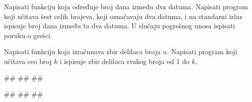 \begin{Exercise}[label=p1.4_] 
Napisati funkciju  koja određuje broj
dana između dva datuma. Napisati program koji učitava šest celih
brojeva, koji označavaju dva datuma, i na standarni izlaz ispisuje
broj dana između ta dva datuma. U slučaju pogrešnog unosa ispisati
poruku o grešci.

\end{Exercise}
\begin{Answer}[ref=p1.4_]
\end{Answer}


\begin{Exercise}[label=p1.4_08] 
 Napisati funkciju  koja izračunava
 zbir delilaca broja $n$. Napisati program koji učitava ceo broj $k$ i
 ispisuje zbir delilaca svakog broja od 1 do $k$.
 
\begin{miditest}
\begin{upotreba}{1}
#\naslovInt#
##
##
\end{upotreba}
\end{miditest}
\begin{miditest}
\begin{upotreba}{2}
#\naslovInt#
##
##
\end{upotreba}
\end{miditest}

\end{Exercise}
\begin{Answer}[ref=p1.4_08]
\end{Answer}


